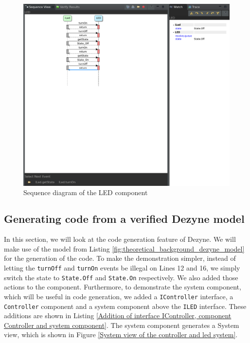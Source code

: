 \documentclass[12pt]{scrreprt}
\begin{document}
\begin{appendices}
\begin{figure}[H]
    \centering
    \includegraphics[width=\textwidth]{Figures/theoretical_background/simulation_of_led.png}
    \caption{Sequence diagram of the LED component}
    \label{Sequence diagram of the LED component}
\end{figure}


\subsection{Generating code from a verified Dezyne model}
\label{Generating code from a verified Dezyne model}
In this section, we will look at the code generation feature of Dezyne. We will make use of the model from Listing \ref{fig:theoretical_background_dezyne_model} for the generation of the code. To make the demonstration simpler, instead of letting the \texttt{turnOff} and \texttt{turnOn} events be illegal on Lines 12 and 16, we simply switch the state to \texttt{State.Off} and \texttt{State.On} respectively. We also added those actions to the component. Furthermore, to demonstrate the system component, which will be useful in code generation, we added a \texttt{IController} interface, a \texttt{Controller} component and a system component above the \texttt{ILED} interface. These additions are shown in Listing \ref{Addition of interface IController, component Controller and system component}. The system component generates a System view, which is shown in Figure \ref{System view of the controller and led system}.
    

\end{appendices}
\end{document}
